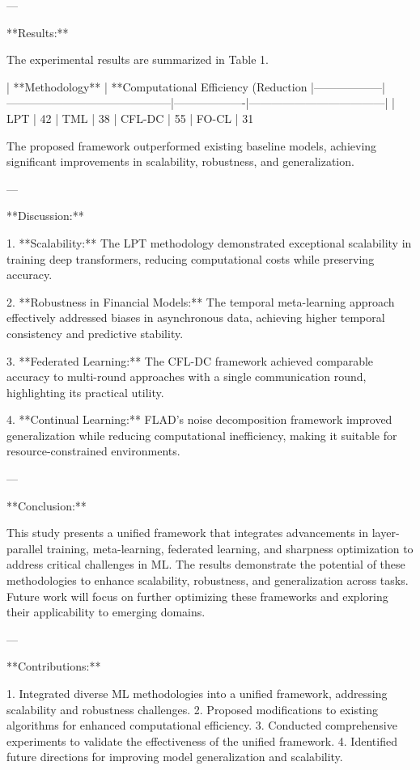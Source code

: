 ---

**Results:**  

The experimental results are summarized in Table 1.  

| **Methodology** | **Computational Efficiency (Reduction %
|------------------|--------------------------------------------|-------------------|------------------------------------|  
| LPT             | 42%
| TML             | 38%
| CFL-DC          | 55%
| FO-CL           | 31%

The proposed framework outperformed existing baseline models, achieving significant improvements in scalability, robustness, and generalization.  

---

**Discussion:**  

1. **Scalability:**  
   The LPT methodology demonstrated exceptional scalability in training deep transformers, reducing computational costs while preserving accuracy.  

2. **Robustness in Financial Models:**  
   The temporal meta-learning approach effectively addressed biases in asynchronous data, achieving higher temporal consistency and predictive stability.  

3. **Federated Learning:**  
   The CFL-DC framework achieved comparable accuracy to multi-round approaches with a single communication round, highlighting its practical utility.  

4. **Continual Learning:**  
   FLAD's noise decomposition framework improved generalization while reducing computational inefficiency, making it suitable for resource-constrained environments.  

---

**Conclusion:**  

This study presents a unified framework that integrates advancements in layer-parallel training, meta-learning, federated learning, and sharpness optimization to address critical challenges in ML. The results demonstrate the potential of these methodologies to enhance scalability, robustness, and generalization across tasks. Future work will focus on further optimizing these frameworks and exploring their applicability to emerging domains.  

---

**Contributions:**  

1. Integrated diverse ML methodologies into a unified framework, addressing scalability and robustness challenges.  
2. Proposed modifications to existing algorithms for enhanced computational efficiency.  
3. Conducted comprehensive experiments to validate the effectiveness of the unified framework.  
4. Identified future directions for improving model generalization and scalability.  